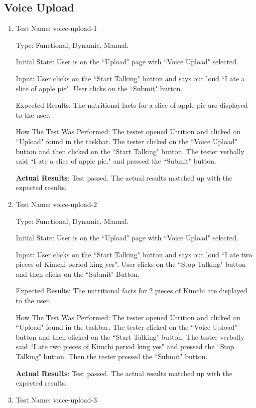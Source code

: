 \documentclass[12pt, titlepage]{article}
\begin{document}
	\subsection{Voice Upload}
	\begin{enumerate}
		\item{Test Name: voice-upload-1}
		
		Type: Functional, Dynamic, Manual.
		
		Initial State: User is on the ``Upload" page with ``Voice Upload" selected.
		
		Input: User clicks on the ``Start Talking" button and says out loud ``I ate a slice of apple pie". User clicks on the ``Submit" button.
		
		Expected Results: The nutritional facts for a slice of apple pie are displayed to the user.
		
		How The Test Was Performed: The tester opened Utrition and clicked on ``Upload" found in the taskbar. The tester clicked on the ``Voice Upload" button and then clicked on the ``Start Talking" button. The tester verbally said ``I ate a slice of apple pie." and pressed the ``Submit" button.
		
		\textbf{Actual Results}: Test passed. The actual results matched up with the expected results.
		
		\item{Test Name: voice-upload-2}
		
		Type: Functional, Dynamic, Manual.
		
		Initial State: User is on the ``Upload" page with ``Voice Upload" selected.
		
		Input: User clicks on the ``Start Talking" button and says out loud ``I ate two pieces of Kimchi period king yes". User clicks on the ``Stop Talking" button and then clicks on the ``Submit" Button.
		
		Expected Results: The nutritional facts for 2 pieces of Kimchi are displayed to the user.
		
		How The Test Was Performed: The tester opened Utrition and clicked on ``Upload" found in the taskbar. The tester clicked on the ``Voice Upload" button and then clicked on the ``Start Talking" button. The tester verbally said ``I ate two pieces of Kimchi period king yes" and pressed the ``Stop Talking" button. Then the tester pressed the ``Submit" button.
		
		\textbf{Actual Results}: Test passed. The actual results matched up with the expected results.
		
		\item{Test Name: voice-upload-3}
		

\end{enumerate}
\end{document}
